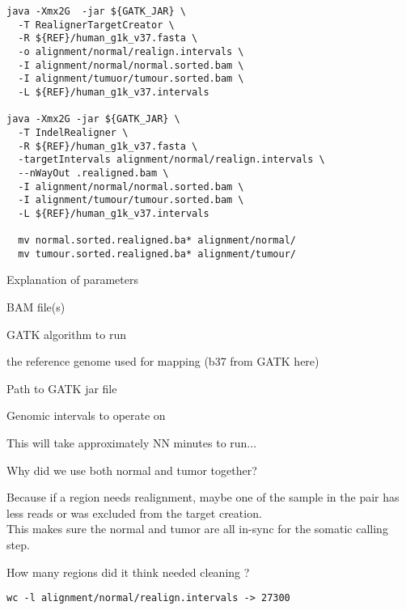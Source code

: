 \begin{lstlisting}
java -Xmx2G  -jar ${GATK_JAR} \
  -T RealignerTargetCreator \
  -R ${REF}/human_g1k_v37.fasta \
  -o alignment/normal/realign.intervals \
  -I alignment/normal/normal.sorted.bam \
  -I alignment/tumuor/tumour.sorted.bam \
  -L ${REF}/human_g1k_v37.intervals

java -Xmx2G -jar ${GATK_JAR} \
  -T IndelRealigner \
  -R ${REF}/human_g1k_v37.fasta \
  -targetIntervals alignment/normal/realign.intervals \
  --nWayOut .realigned.bam \
  -I alignment/normal/normal.sorted.bam \
  -I alignment/tumour/tumour.sorted.bam \
  -L ${REF}/human_g1k_v37.intervals

  mv normal.sorted.realigned.ba* alignment/normal/
  mv tumour.sorted.realigned.ba* alignment/tumour/
\end{lstlisting}


\begin{note}
Explanation of parameters
\begin{description}[style=multiline,labelindent=0cm,align=right,leftmargin=\descriptionlabelspace,rightmargin=1.5cm,font=\ttfamily]
 \item[-I] BAM file(s)
 \item[-T] GATK algorithm to run
 \item[-R] the reference genome used for mapping (b37 from GATK here)
 \item[-jar] Path to GATK jar file
 \item[-L] Genomic intervals to operate on
\end{description}
\end{note}

This will take approximately NN minutes to run... \\

\begin{question} 
Why did we use both normal and tumor together?
\end{question}
\begin{answer}
Because if a region needs realignment, maybe one of the sample in the pair has less reads or was excluded from the target creation. \\
This makes sure the normal and tumor are all in-sync for the somatic calling step. 
\end{answer}

\begin{question} 
How many regions did it think needed cleaning ? 
\end{question}
\begin{answer}
\begin{lstlisting}
wc -l alignment/normal/realign.intervals -> 27300
\end{lstlisting}
\end{answer}

